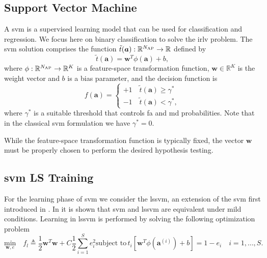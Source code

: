 \documentclass[draftcls,onecolumn,12pt]{IEEEtran}
\begin{document}
\subsection{Support Vector Machine}\label{sec:svm}
A \ac{svm} \cite{Bishop2006} is a supervised learning model that can be used for classification and regression. We focus here on binary classification to solve the \ac{irlv} problem. The \ac{svm} solution comprises the function $\tilde{t}(\bm{a}): \mathbb{R}^{N_{\rm AP}} \to \mathbb{R}$ defined by
\begin{equation}
\label{eq:svm}
\tilde{t}(\bm{a}) = \bm{w}^T \phi (\bm{a}) + b,
\end{equation}
where $\phi: \mathbb{R}^{N_{\rm AP}} \to \mathbb{R}^K$ is a feature-space transformation function, $\bm{w} \in \mathbb{R}^K$ is the weight vector and $b$ is a bias parameter, and the decision function is
\begin{equation}
\label{eq:cases}
f(\bm{a}) = 
\begin{cases}
+1 \quad \tilde{t}(\bm{a})  \geq \gamma^* \\
-1 \quad \tilde{t}(\bm{a})  < \gamma^*,
\end{cases}		
\end{equation} 
where $\gamma^*$ is a suitable threshold that controls \ac{fa} and \ac{md} probabilities. Note that in the classical \ac{svm} formulation we have $\gamma^* = 0$.

While the feature-space transformation function is typically fixed, the vector $\bm{w}$ must be properly chosen to perform the desired hypothesis testing. 

\subsection{\ac{svm} LS Training}
For the learning phase of \ac{svm} we consider the \ac{lssvm}, an extension of the \ac{svm} first introduced in \cite{Suykens1999}. In \cite{Yevs} it is shown that  \ac{svm} and \ac{lssvm} are equivalent under mild conditions. Learning in \ac{lssvm} is performed by solving the following optimization problem
\begin{subequations}
	\label{eq:lssvm}
	\begin{equation}
	\label{eq:lssvmOrig}
	\underset{\bm{w},e}{\text{min}} \quad f_l \triangleq \frac{1}{2} \bm{w}^T \bm{w} + C \frac{1}{2} \sum_{i=1}^S e_i ^2 
	\end{equation}
	\begin{equation}
	\label{eq:stpart}
	\text{subject to}\,  t_i[\bm{w}^T \phi (\bm{a}^{(i)}) + b] = 1- e_i\quad i = 1 ,\dots,S.
	\end{equation}
\end{subequations}
\end{document}
